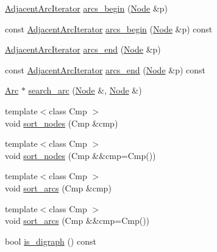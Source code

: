 \begin{DoxyCompactItemize}
\item 
\hyperlink{class_designar_1_1_digraph_1_1_adjacent_arc_iterator}{Adjacent\+Arc\+Iterator} \hyperlink{class_designar_1_1_digraph_a3c1eeda482f59951e1191ea2e0dd514a}{arcs\+\_\+begin} (\hyperlink{class_designar_1_1_digraph_a4dc921c41a480b7946a04170e997d8ae}{Node} \&p)
\item 
const \hyperlink{class_designar_1_1_digraph_1_1_adjacent_arc_iterator}{Adjacent\+Arc\+Iterator} \hyperlink{class_designar_1_1_digraph_aa17a29b3ea956a3ad98e991fb13d0a20}{arcs\+\_\+begin} (\hyperlink{class_designar_1_1_digraph_a4dc921c41a480b7946a04170e997d8ae}{Node} \&p) const
\item 
\hyperlink{class_designar_1_1_digraph_1_1_adjacent_arc_iterator}{Adjacent\+Arc\+Iterator} \hyperlink{class_designar_1_1_digraph_ab7e47c93dd15bab0510977f403a35849}{arcs\+\_\+end} (\hyperlink{class_designar_1_1_digraph_a4dc921c41a480b7946a04170e997d8ae}{Node} \&p)
\item 
const \hyperlink{class_designar_1_1_digraph_1_1_adjacent_arc_iterator}{Adjacent\+Arc\+Iterator} \hyperlink{class_designar_1_1_digraph_a68abe34d6f5a7b429715ec55aa030b7d}{arcs\+\_\+end} (\hyperlink{class_designar_1_1_digraph_a4dc921c41a480b7946a04170e997d8ae}{Node} \&p) const
\item 
\hyperlink{class_designar_1_1_digraph_a0ceb278671f2a535c00fddccdeafd69f}{Arc} $\ast$ \hyperlink{class_designar_1_1_digraph_ac301ebe5d45b2864639d68d7e9aeea2a}{search\+\_\+arc} (\hyperlink{class_designar_1_1_digraph_a4dc921c41a480b7946a04170e997d8ae}{Node} \&, \hyperlink{class_designar_1_1_digraph_a4dc921c41a480b7946a04170e997d8ae}{Node} \&)
\item 
{\footnotesize template$<$class Cmp $>$ }\\void \hyperlink{class_designar_1_1_digraph_a5d057854409452b7d4fb2f9eec217b7d}{sort\+\_\+nodes} (Cmp \&cmp)
\item 
{\footnotesize template$<$class Cmp $>$ }\\void \hyperlink{class_designar_1_1_digraph_af62a8c0997715ef3bdebfe56f328ea1c}{sort\+\_\+nodes} (Cmp \&\&cmp=Cmp())
\item 
{\footnotesize template$<$class Cmp $>$ }\\void \hyperlink{class_designar_1_1_digraph_a450085493969a382371f7d4d407e42cd}{sort\+\_\+arcs} (Cmp \&cmp)
\item 
{\footnotesize template$<$class Cmp $>$ }\\void \hyperlink{class_designar_1_1_digraph_a44895030e02896d6d35277eec136c49f}{sort\+\_\+arcs} (Cmp \&\&cmp=Cmp())
\item 
bool \hyperlink{class_designar_1_1_digraph_a6751952e13a35cf7aa452a8bb243f53d}{is\+\_\+digraph} () const
\end{DoxyCompactItemize}
